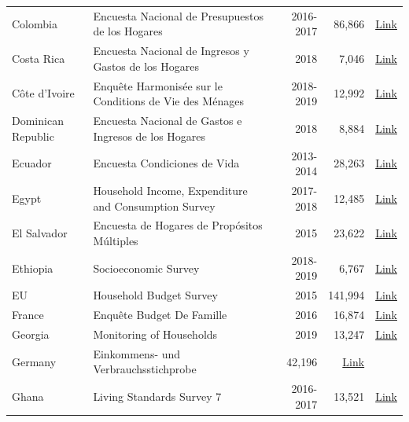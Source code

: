 \begin{ThreePartTable}
\begin{longtable}[t]{l|p{8cm}|r|r|c}
        Colombia & Encuesta Nacional de Presupuestos de los Hogares & 2016-2017 &  86,866  & \href{https://www.dane.gov.co/index.php/estadisticas-por-tema/pobreza-y-condiciones-de-vida/encuesta-nacional-de-presupuestos-de-los-hogares-enph}{Link} \\ 
        Costa Rica & Encuesta Nacional de Ingresos y Gastos de los Hogares & 2018 &  7,046  & \href{https://inec.cr/estadisticas-fuentes/encuestas/encuesta-nacional-ingresos-gastos-los-hogares}{Link} \\ 
        Côte d'Ivoire & Enquête Harmonisée sur le Conditions de Vie des Ménages & 2018-2019 &  12,992  & \href{https://microdata.worldbank.org/index.php/catalog/4292/study-description}{Link} \\ 
        Dominican Republic & Encuesta Nacional de Gastos e Ingresos de los Hogares & 2018 &  8,884  & \href{https://archivo.one.gob.do/encuestas/enigh}{Link} \\ 
        Ecuador & Encuesta Condiciones de Vida & 2013-2014 &  28,263  & \href{https://aplicaciones3.ecuadorencifras.gob.ec/BIINEC-war/index.xhtml}{Link} \\ 
        Egypt & Household Income, Expenditure and Consumption Survey & 2017-2018 &  12,485  & \href{http://www.erfdataportal.com/index.php/catalog/129}{Link} \\ 
        El Salvador & Encuesta de Hogares de Propósitos Múltiples & 2015 &  23,622  & \href{http://www.digestyc.gob.sv/index.php/temas/des/ehpm.html}{Link} \\ 
        Ethiopia & Socioeconomic Survey & 2018-2019 &  6,767  & \href{https://microdata.worldbank.org/index.php/catalog/3823}{Link} \\ 
        EU & Household Budget Survey & 2015 &  141,994  & \href{https://ec.europa.eu/eurostat/web/microdata/household-budget-survey}{Link} \\ 
        France & Enquête Budget De Famille & 2016 & 16,874 & \href{https://data.progedo.fr/studies/doi/10.13144/lil-1416?tab=access}{Link} \\
        Georgia & Monitoring of Households & 2019 &  13,247  & \href{https://www.geostat.ge/en/modules/categories/128/databases-of-2009-2016-integrated-household-survey-and-2017-households-income-and-expenditure-survey}{Link} \\ 
        Germany & Einkommens- und Verbrauchsstichprobe & 42,196 & \href{https://www.forschungsdatenzentrum.de/de/haushalte/evs}{Link} \\
        Ghana & Living Standards Survey 7 & 2016-2017 &  13,521  & \href{https://www2.statsghana.gov.gh/nada/index.php/catalog/97/study-description}{Link} \\ 

\end{longtable}
\end{ThreePartTable}
